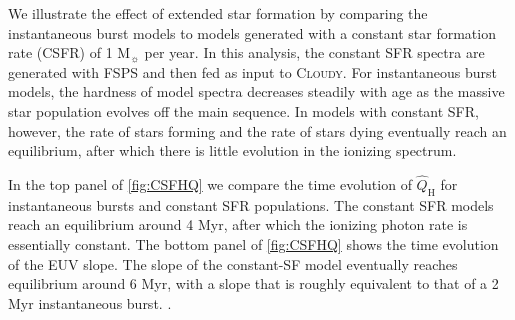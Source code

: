 \documentclass[linenumbers, trackchanges, tighten]{aastex61}%
\newcommand{\Fig}[1]{\autoref{fig:#1}}
\newcommand{\FSPS}{{\sc FSPS}\xspace}
\newcommand{\Cloudy}{\textsc{Cloudy}\xspace}
\newcommand\Msun{\ensuremath{\mathrm{M_{\sun}}}}
\newcommand{\QHat}{\ensuremath{\hat{Q}_{\mathrm{H}}}}
\begin{document}
We illustrate the effect of extended star formation by comparing the instantaneous burst models to models generated with a constant star formation rate (CSFR) of 1 \Msun{} per year. In this analysis, the constant SFR spectra are generated with \FSPS and then fed as input to \Cloudy. For instantaneous burst models, the hardness of model spectra decreases steadily with age as the massive star population evolves off the main sequence. In models with constant SFR, however, the rate of stars forming and the rate of stars dying eventually reach an equilibrium, after which there is little evolution in the ionizing spectrum. 

In the top panel of \Fig{CSFHQ} we compare the time evolution of \QHat{} for instantaneous bursts and constant SFR populations. The constant SFR models reach an equilibrium around 4 Myr, after which the ionizing photon rate is essentially constant. The bottom panel of \Fig{CSFHQ} shows the time evolution of the EUV slope. The slope of the constant-SF model eventually reaches equilibrium around 6 Myr, with a slope that is roughly equivalent to that of a 2 Myr instantaneous burst. .
\end{document}
